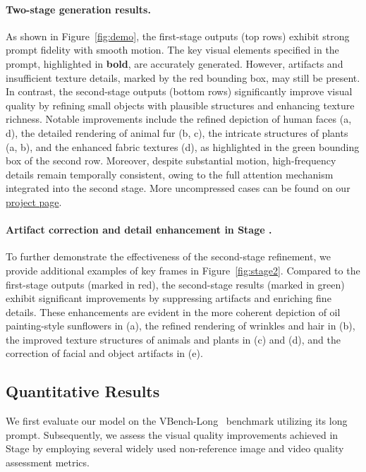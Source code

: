 \paragraph{Two-stage generation results.}
As shown in Figure~\ref{fig:demo}, the first-stage outputs (top rows) exhibit strong prompt fidelity with smooth motion. The key visual elements specified in the prompt, highlighted in \textbf{bold}, are accurately generated. However, artifacts and insufficient texture details, marked by the red bounding box, may still be present. In contrast, the second-stage outputs (bottom rows) significantly improve visual quality by refining small objects with plausible structures and enhancing texture richness. Notable improvements include the refined depiction of human faces (a, d), the detailed rendering of animal fur (b, c), the intricate structures of plants (a, b), and the enhanced fabric textures (d), as highlighted in the green bounding box of the second row. Moreover, despite substantial motion, high-frequency details remain temporally consistent, owing to the full attention mechanism integrated into the second stage. More uncompressed cases can be found on our \href{https://jshilong.github.io/flashvideo-page/}{project page}.



\paragraph{Artifact correction and detail enhancement in Stage .}
To further demonstrate the effectiveness of the second-stage refinement, we provide additional examples of key frames in Figure~\ref{fig:stage2}. Compared to the first-stage outputs (marked in red), the second-stage results (marked in green) exhibit significant improvements by suppressing artifacts and enriching fine details. These enhancements are evident in the more coherent depiction of oil painting-style sunflowers in (a), the refined rendering of wrinkles and hair in (b), the improved texture structures of animals and plants in (c) and (d), and the correction of facial and object artifacts in (e).



\subsection{Quantitative Results}

We first evaluate our model on the VBench-Long~\citep{huang2024vbench} benchmark utilizing  its long prompt. Subsequently, we assess the visual quality improvements achieved in Stage  by employing several widely used non-reference image and video quality assessment metrics.



